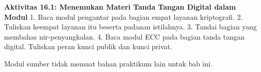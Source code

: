 \begin{obeactivity}
\textbf{Aktivitas 16.1: Menemukan Materi Tanda Tangan Digital dalam Modul}
1. Baca modul pengantar pada bagian empat layanan kriptografi.
2. Tuliskan keempat layanan itu beserta padanan istilahnya.
3. Tandai bagian yang membahas nir-penyangkalan.
4. Baca modul ECC pada bagian tanda tangan digital. Tuliskan peran kunci publik
   dan kunci privat.
\end{obeactivity}

Modul sumber tidak memuat bahan praktikum lain untuk bab ini.
